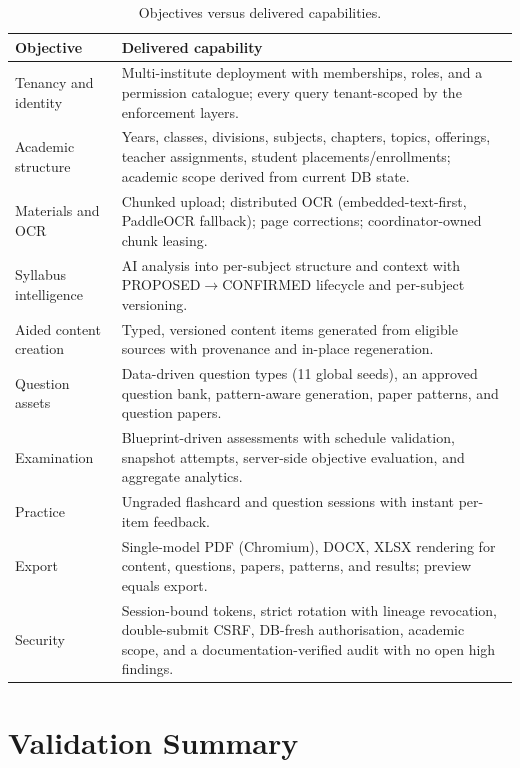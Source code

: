\begin{table}[htbp]
\centering
\small
\begin{tabular}{@{}p{2.9cm}p{11.4cm}@{}}
\toprule
\textbf{Objective} & \textbf{Delivered capability} \\
\midrule
Tenancy and identity & Multi-institute deployment with memberships, roles,
and a permission catalogue; every query tenant-scoped by the enforcement
layers. \\
Academic structure & Years, classes, divisions, subjects, chapters, topics,
offerings, teacher assignments, student placements/enrollments; academic scope
derived from current DB state. \\
Materials and OCR & Chunked upload; distributed OCR (embedded-text-first,
PaddleOCR fallback); page corrections; coordinator-owned chunk leasing. \\
Syllabus intelligence & AI analysis into per-subject structure and context
with PROPOSED$\rightarrow$CONFIRMED lifecycle and per-subject versioning. \\
Aided content creation & Typed, versioned content items generated from
eligible sources with provenance and in-place regeneration. \\
Question assets & Data-driven question types (11 global seeds), an approved
question bank, pattern-aware generation, paper patterns, and question papers. \\
Examination & Blueprint-driven assessments with schedule validation,
snapshot attempts, server-side objective evaluation, and aggregate analytics. \\
Practice & Ungraded flashcard and question sessions with instant per-item
feedback. \\
Export & Single-model PDF (Chromium), DOCX, XLSX rendering for content,
questions, papers, patterns, and results; preview equals export. \\
Security & Session-bound tokens, strict rotation with lineage revocation,
double-submit CSRF, DB-fresh authorisation, academic scope, and a
documentation-verified audit with no open high findings. \\
\bottomrule
\end{tabular}
\caption{Objectives versus delivered capabilities.}
\label{tab:results}
\end{table}

\section{Validation Summary}

